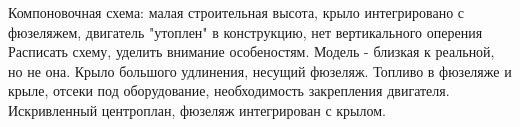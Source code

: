 Компоновочная схема: малая строительная высота, крыло интегрировано с фюзеляжем, двигатель "утоплен" в конструкцию, нет вертикального оперения Расписать схему, уделить внимание особеностям. Модель - близкая к реальной, но не она. 
Крыло большого удлинения, несущий фюзеляж. Топливо в фюзеляже и крыле, отсеки под оборудование, необходимость закрепления двигателя. Искривленный центроплан, фюзеляж интегрирован с крылом.